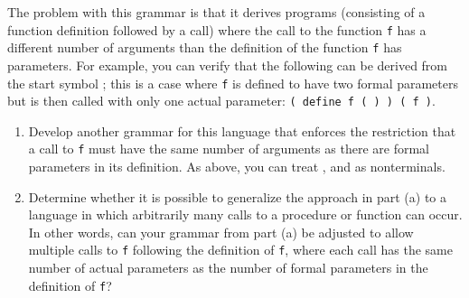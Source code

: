 \documentclass[11pt]{article}
\begin{document}
\begin{enumerate}
          The problem with this grammar is that it derives programs
          (consisting of a function definition followed by a call) where the
          call to the function \texttt{f} has a different number of
          arguments than the definition of the function \texttt{f} has
          parameters.  For example, you can verify that the following can be
          derived from the start symbol ; this is a case where
          \texttt{f} is defined to have two formal parameters but is then
          called with only one actual parameter: \texttt{( define f (
            )  ) ( f  )}.

          \vspace{-2mm}

          \begin{enumerate}

            \addtolength{\itemsep}{1mm}

            \item Develop another grammar for this language that enforces
                  the restriction that a call to \texttt{f} must have the
                  same number of arguments as there are formal parameters in
                  its definition.  As above, you can treat ,
                   and  as nonterminals.

            \item Determine whether it is possible to generalize the
                  approach in part (a) to a language in which arbitrarily
                  many calls to a procedure or function can occur.  In other
                  words, can your grammar from part (a) be adjusted to allow
                  multiple calls to \texttt{f} following the definition of
                  \texttt{f}, where each call has the same number of actual
                  parameters as the number of formal parameters in the
                  definition of \texttt{f}?

          \end{enumerate}


\end{enumerate}
\end{document}
